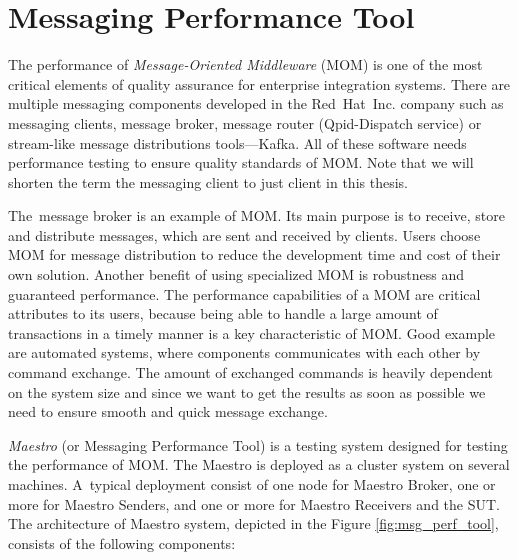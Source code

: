
\chapter{Messaging Performance Tool}
\label{Messaging Performance Tool}
The performance of \emph{Message-Oriented Middleware} (MOM) \cite{CURRY:MOM} is one of the most critical elements of quality assurance for enterprise integration systems. There are multiple messaging components developed in the Red~Hat~Inc. company such as messaging clients, message broker, message router (Qpid-Dispatch service) or stream-like message distributions tools---Kafka. All of these software needs performance testing to ensure quality standards of MOM. Note that we will shorten the term the messaging client to just client in this thesis.

The~message broker is an example of MOM. Its main purpose is to receive, store and distribute messages, which are sent and received by clients. Users choose MOM for message distribution to reduce the development time and cost of their own solution. Another benefit of using specialized MOM is robustness and guaranteed performance. The performance capabilities of a MOM are critical attributes to its users, because being able to handle a large amount of transactions in a timely manner is a key characteristic of MOM. Good example are automated systems, where components communicates with each other by command exchange. The amount of exchanged commands is heavily dependent on the system size and since we want to get the results as soon as possible we need to ensure smooth and quick message exchange.

\emph{Maestro} (or Messaging Performance Tool) \cite{ORPISKE:MSGPT} is a testing system designed for testing the performance of MOM. The Maestro is deployed as a cluster system on several machines. A~typical deployment consist of one node for Maestro Broker, one or more for Maestro Senders, and one or more for Maestro Receivers and the SUT. The architecture of Maestro system, depicted in the Figure \ref{fig:msg_perf_tool}, consists of the following components:

